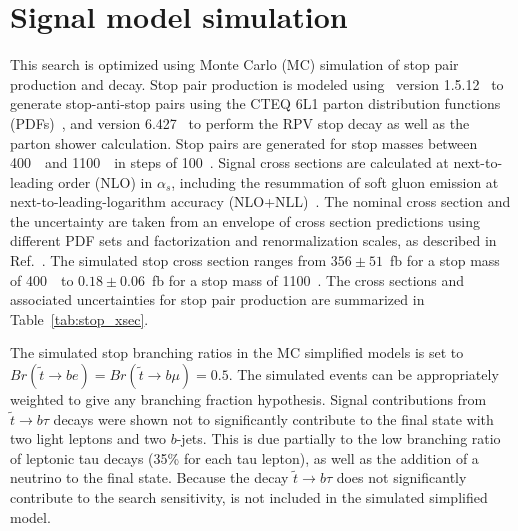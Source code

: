 \FloatBarrier
\section{Signal model simulation}
\label{sec:signal_model_mc}

This search is optimized using Monte Carlo (MC) simulation of stop pair
production and decay.
Stop pair production is modeled using \madgraph\ version
1.5.12~\cite{Alwall:2011uj} to generate stop-anti-stop pairs using the
CTEQ 6L1 parton distribution functions (PDFs)~\cite{Nadolsky:2008zw},
and \pythia version 6.427~\cite{Sjostrand:2006za} to perform the
RPV stop decay as well as the parton shower calculation.
Stop pairs are generated for stop masses between 400~\GeV\ and 1100~\GeV\ in
steps of 100~\GeV.
Signal cross sections are calculated at next-to-leading order (NLO) in
$\alpha_s$, including the resummation of soft gluon emission at
next-to-leading-logarithm accuracy
(NLO+NLL)~\cite{Beenakker:1997ut,Beenakker:2010nq,Beenakker:2011fu}.
The nominal cross section and the uncertainty are taken from an envelope of
cross section predictions using different PDF sets and factorization and
renormalization scales, as described in Ref.~\cite{Kramer:2012bx}.
The simulated stop cross section ranges from $356 \pm 51$~fb for a stop mass
of 400~\GeV\ to $0.18 \pm 0.06$~fb for a stop mass of 1100~\GeV.
The cross sections and associated uncertainties for stop pair production are
summarized in Table~\ref{tab:stop_xsec}.

The simulated stop branching ratios in the MC simplified models is set to 
$Br(\tilde{t} \rightarrow be) = Br(\tilde{t} \rightarrow b\mu) = 0.5$.
The simulated events can be appropriately weighted to give any branching fraction
hypothesis.
Signal contributions from $\tilde{t} \rightarrow b\tau$ decays were shown not
to significantly contribute to the final state with two light leptons and two
$b$-jets.
This is due partially to the low branching ratio of leptonic tau decays (35\%
for each tau lepton), as well as the addition of a neutrino to the final state.
Because the decay $\tilde{t} \rightarrow b\tau$ does not significantly
contribute to the search sensitivity, is not included in the simulated
simplified model.

